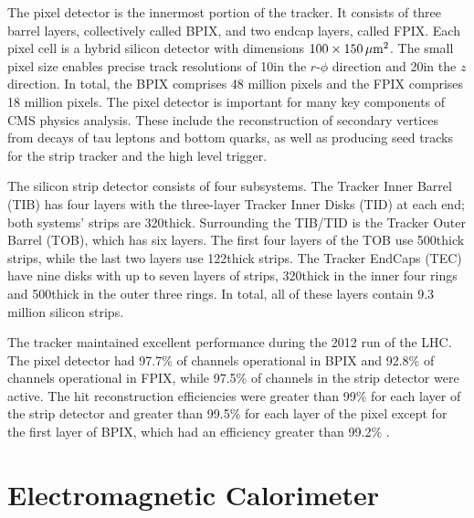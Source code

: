 The pixel detector is the innermost portion of the tracker. It consists of three barrel layers, collectively called BPIX, and two endcap layers, called FPIX. Each pixel cell is a hybrid silicon detector with dimensions $100\times150\,\mu\text{m}^{2}$. The small pixel size enables precise track resolutions of 10\mum in the $r$-$\phi$ direction and 20\mum in the $z$ direction. In total, the BPIX comprises 48 million pixels and the FPIX comprises 18 million pixels. The pixel detector is important for many key components of CMS physics analysis. These include the reconstruction of secondary vertices from decays of tau leptons and bottom quarks, as well as producing seed tracks for the strip tracker and the high level trigger.

The silicon strip detector consists of four subsystems. The Tracker Inner Barrel (TIB) has four layers with the three-layer Tracker Inner Disks (TID) at each end; both systems' strips are 320\mum thick. Surrounding the TIB/TID is the Tracker Outer Barrel (TOB), which has six layers. The first four layers of the TOB use 500\mum thick strips, while the last two layers use 122\mum thick strips. The Tracker EndCaps (TEC) have nine disks with up to seven layers of strips, 320\mum thick in the inner four rings and 500\mum thick in the outer three rings. In total, all of these layers contain 9.3 million silicon strips.

The tracker maintained excellent performance during the 2012 run of the LHC. The pixel detector had 97.7\% of channels operational in BPIX and 92.8\% of channels operational in FPIX, while 97.5\% of channels in the strip detector were active. The hit reconstruction efficiencies were greater than 99\% for each layer of the strip detector and greater than 99.5\% for each layer of the pixel except for the first layer of BPIX, which had an efficiency greater than 99.2\% \cite{Veszpremi:2014hpa}. 

\section{Electromagnetic Calorimeter}

